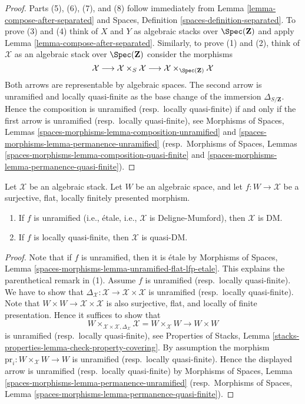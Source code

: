 \begin{proof}
Parts (5), (6), (7), and (8) follow immediately from
Lemma \ref{lemma-compose-after-separated}
and
Spaces, Definition \ref{spaces-definition-separated}.
To prove (3) and (4) think of $X$ and $Y$ as algebraic stacks over
$\Spec(\mathbf{Z})$ and apply
Lemma \ref{lemma-compose-after-separated}.
Similarly, to prove (1) and (2), think of $\mathcal{X}$ as an algebraic
stack over $\Spec(\mathbf{Z})$ consider the
morphisms
$$
\mathcal{X} \longrightarrow
\mathcal{X} \times_S \mathcal{X} \longrightarrow
\mathcal{X} \times_{\Spec(\mathbf{Z})} \mathcal{X}
$$
Both arrows are representable by algebraic spaces.
The second arrow is unramified and locally quasi-finite as the base change of
the immersion $\Delta_{S/\mathbf{Z}}$. Hence the composition is
unramified (resp.\ locally quasi-finite) if and only if the first arrow
is unramified (resp.\ locally quasi-finite), see
Morphisms of Spaces,
Lemmas \ref{spaces-morphisms-lemma-composition-unramified} and
\ref{spaces-morphisms-lemma-permanence-unramified}
(resp.\ Morphisms of Spaces,
Lemmas \ref{spaces-morphisms-lemma-composition-quasi-finite} and
\ref{spaces-morphisms-lemma-permanence-quasi-finite}).
\end{proof}

\begin{lemma}
\label{lemma-properties-covering-imply-diagonal}
Let $\mathcal{X}$ be an algebraic stack.
Let $W$ be an algebraic space, and let $f : W \to \mathcal{X}$
be a surjective, flat, locally finitely presented morphism.
\begin{enumerate}
\item If $f$ is unramified (i.e., \'etale, i.e., $\mathcal{X}$
is Deligne-Mumford), then $\mathcal{X}$ is DM.
\item If $f$ is locally quasi-finite, then $\mathcal{X}$ is quasi-DM.
\end{enumerate}
\end{lemma}

\begin{proof}
Note that if $f$ is unramified, then it is \'etale by
Morphisms of Spaces, Lemma
\ref{spaces-morphisms-lemma-unramified-flat-lfp-etale}.
This explains the parenthetical remark in (1).
Assume $f$ is unramified (resp.\ locally quasi-finite). We have to show that
$\Delta_\mathcal{X} : \mathcal{X} \to \mathcal{X} \times \mathcal{X}$
is unramified (resp.\ locally quasi-finite). Note that
$W \times W \to \mathcal{X} \times \mathcal{X}$ is also
surjective, flat, and locally of finite presentation. Hence it suffices to
show that
$$
W \times_{\mathcal{X} \times \mathcal{X}, \Delta_\mathcal{X}} \mathcal{X}
=
W \times_\mathcal{X} W
\longrightarrow
W \times W
$$
is unramified (resp.\ locally quasi-finite), see
Properties of Stacks, Lemma
\ref{stacks-properties-lemma-check-property-covering}.
By assumption the morphism $\text{pr}_i : W \times_\mathcal{X} W \to W$
is unramified (resp.\ locally quasi-finite). Hence
the displayed arrow is unramified (resp.\ locally quasi-finite) by
Morphisms of Spaces, Lemma
\ref{spaces-morphisms-lemma-permanence-unramified}
(resp.\ Morphisms of Spaces, Lemma
\ref{spaces-morphisms-lemma-permanence-quasi-finite}).
\end{proof}


